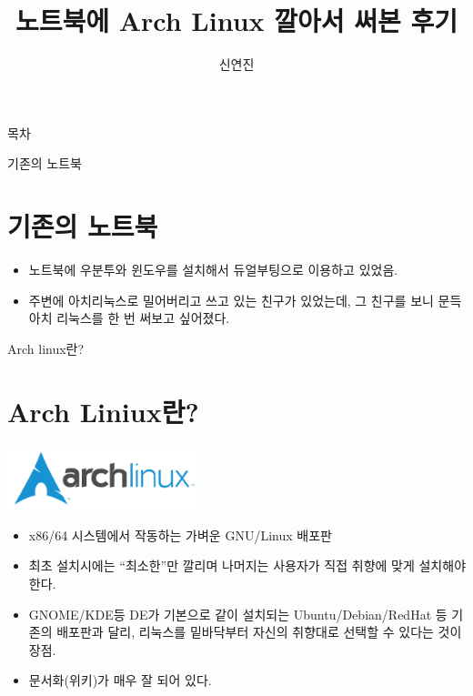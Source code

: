 \documentclass{beamer}
\title{노트북에 Arch Linux 깔아서 써본 후기}
\author{신연진}
\begin{document}
\begin{frame}
    \maketitle
\end{frame}

\begin{frame}{목차}
    \tableofcontents
\end{frame}

\begin{frame}{기존의 노트북}
    \section{기존의 노트북}
    \begin{itemize}
     \item 노트북에 우분투와 윈도우를 설치해서 듀얼부팅으로 이용하고 있었음.
     \item 주변에 아치리눅스로 밀어버리고 쓰고 있는 친구가 있었는데, 그 친구를 보니 문득 아치 리눅스를 한 번 써보고 싶어졌다.
    \end{itemize}
\end{frame}

\begin{frame}{Arch linux란?}
    \section{Arch Liniux란?}
    \includegraphics[width=15em]{archlinux logo.png}
    \begin{itemize}
        \item x86/64 시스템에서 작동하는 가벼운 GNU/Linux 배포판
        \item 최초 설치시에는 ``최소한''만 깔리며 나머지는 사용자가 직접 취향에 맞게 설치해야 한다.
        \item GNOME/KDE등 DE가 기본으로 같이 설치되는 Ubuntu/Debian/RedHat 등 기존의 배포판과 달리, 리눅스를 밑바닥부터 자신의 취향대로 선택할 수 있다는 것이 장점.
        \item 문서화(위키)가 매우 잘 되어 있다.
    \end{itemize}
\end{frame}
\end{document}
